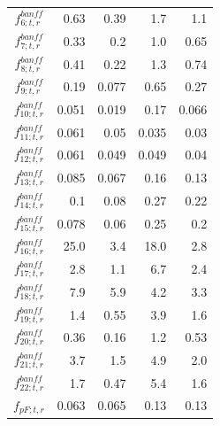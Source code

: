 \begin{table}
\begin{tabular}{| c || D{.}{.}{-1} | D{.}{.}{-1} || D{.}{.}{-1} | D{.}{.}{-1} |}
         $f_{6; t, r}^{banff}$ &            0.63 &            0.39 &             1.7 &             1.1  \\   
         $f_{7; t, r}^{banff}$ &            0.33 &             0.2 &             1.0 &            0.65  \\   
         $f_{8; t, r}^{banff}$ &            0.41 &            0.22 &             1.3 &            0.74  \\   
         $f_{9; t, r}^{banff}$ &            0.19 &           0.077 &            0.65 &            0.27  \\   
        $f_{10; t, r}^{banff}$ &           0.051 &           0.019 &            0.17 &           0.066  \\   
        $f_{11; t, r}^{banff}$ &           0.061 &            0.05 &           0.035 &            0.03  \\   
        $f_{12; t, r}^{banff}$ &           0.061 &           0.049 &           0.049 &            0.04  \\   
        $f_{13; t, r}^{banff}$ &           0.085 &           0.067 &            0.16 &            0.13  \\   
        $f_{14; t, r}^{banff}$ &             0.1 &            0.08 &            0.27 &            0.22  \\   
        $f_{15; t, r}^{banff}$ &           0.078 &            0.06 &            0.25 &             0.2  \\   
        $f_{16; t, r}^{banff}$ &            25.0 &             3.4 &            18.0 &             2.8  \\   
        $f_{17; t, r}^{banff}$ &             2.8 &             1.1 &             6.7 &             2.4  \\   
        $f_{18; t, r}^{banff}$ &             7.9 &             5.9 &             4.2 &             3.3  \\   
        $f_{19; t, r}^{banff}$ &             1.4 &            0.55 &             3.9 &             1.6  \\   
        $f_{20; t, r}^{banff}$ &            0.36 &            0.16 &             1.2 &            0.53  \\   
        $f_{21; t, r}^{banff}$ &             3.7 &             1.5 &             4.9 &             2.0  \\   
        $f_{22; t, r}^{banff}$ &             1.7 &            0.47 &             5.4 &             1.6  \\   
\hline
                $f_{pF; t, r}$ &           0.063 &           0.065 &            0.13 &            0.13  \\   

\end{tabular}
\end{table}
